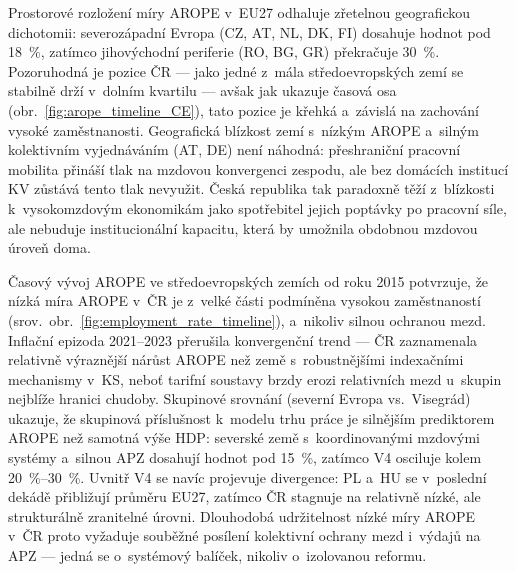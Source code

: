 Prostorové rozložení míry \ac{AROPE} v~EU27 odhaluje zřetelnou geografickou dichotomii: severozápadní Evropa (CZ, AT, NL, DK, FI) dosahuje hodnot pod \SI{18}{\percent}, zatímco jihovýchodní periferie (RO, BG, GR) překračuje \SI{30}{\percent}.
Pozoruhodná je pozice ČR --- jako jedné z~mála středoevropských zemí se stabilně drží v~dolním kvartilu --- avšak jak ukazuje časová osa (obr.~\ref{fig:arope_timeline_CE}), tato pozice je křehká a~závislá na zachování vysoké zaměstnanosti.
Geografická blízkost zemí s~nízkým \ac{AROPE} a~silným kolektivním vyjednáváním (AT, DE) není náhodná: přeshraniční pracovní mobilita přináší tlak na mzdovou konvergenci zespodu, ale bez domácích institucí \ac{KV} zůstává tento tlak nevyužit.
Česká republika tak paradoxně těží z~blízkosti k~vysokomzdovým ekonomikám jako spotřebitel jejich poptávky po pracovní síle, ale nebuduje institucionální kapacitu, která by umožnila obdobnou mzdovou úroveň doma.

Časový vývoj \ac{AROPE} ve středoevropských zemích od roku 2015 potvrzuje, že nízká míra \ac{AROPE} v~ČR je z~velké části podmíněna vysokou zaměstnaností (srov.~obr.~\ref{fig:employment_rate_timeline}), a~nikoliv silnou ochranou mezd.
Inflační epizoda 2021--2023 přerušila konvergenční trend --- ČR zaznamenala relativně výraznější nárůst \ac{AROPE} než země s~robustnějšími indexačními mechanismy v~\ac{KS}, neboť tarifní soustavy brzdy erozi relativních mezd u~skupin nejblíže hranici chudoby.
Skupinové srovnání (severní Evropa vs.~Visegrád) ukazuje, že skupinová příslušnost k~modelu trhu práce je silnějším prediktorem \ac{AROPE} než samotná výše \ac{HDP}: severské země s~koordinovanými mzdovými systémy a~silnou \ac{APZ} dosahují hodnot pod \SI{15}{\percent}, zatímco V4 osciluje kolem \SIrange{20}{30}{\percent}.
Uvnitř V4 se navíc projevuje divergence: PL a~HU se v~poslední dekádě přibližují průměru \ac{EU}27, zatímco ČR stagnuje na relativně nízké, ale strukturálně zranitelné úrovni.
Dlouhodobá udržitelnost nízké míry \ac{AROPE} v~ČR proto vyžaduje souběžné posílení kolektivní ochrany mezd i~výdajů na \ac{APZ} --- jedná se o~systémový balíček, nikoliv o~izolovanou reformu.


